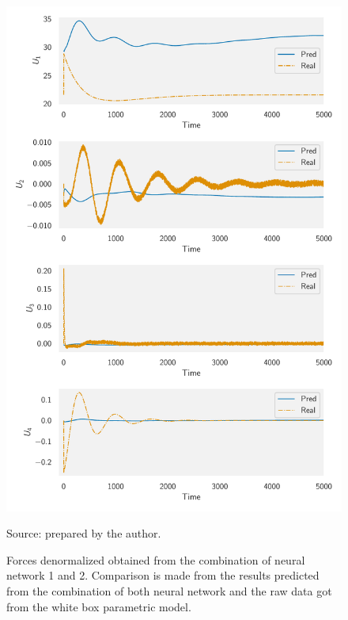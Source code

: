 \begin{figure}[!htb]
    \centering
    \caption[Forces denormalized obtained from the combination of neural network 1 and 2]{Forces denormalized obtained from the combination of neural network 1 and 2. Comparison is made from the results predicted from the combination of both neural network and the raw data got from the white box parametric model.}
    \includegraphics{figures/4results/uav/forces_denormalized.pdf}

    {\footnotesize Source: prepared by the author.}
    \label{fig:forces_denormalized}
\end{figure}

